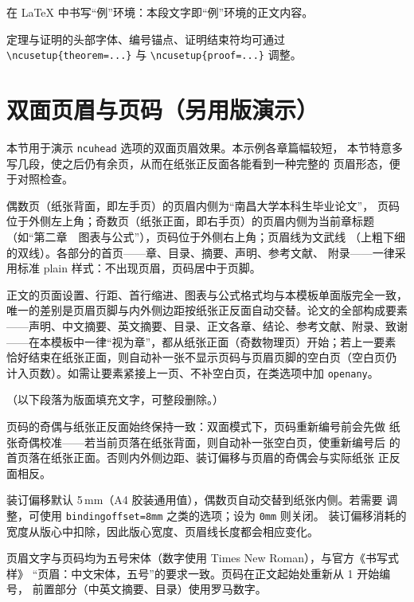 \documentclass[official]{ncubachelor}
\begin{document}
\begin{example}
在 \LaTeX{} 中书写“例”环境：本段文字即“例”环境的正文内容。
\end{example}

\begin{remark}
定理与证明的头部字体、编号锚点、证明结束符均可通过
\verb|\ncusetup{theorem=...}| 与 \verb|\ncusetup{proof=...}| 调整。
\end{remark}

\zhlipsum[3-7]

\section{双面页眉与页码（另用版演示）}

本节用于演示 \verb|ncuhead| 选项的双面页眉效果。本示例各章篇幅较短，
本节特意多写几段，使之后仍有余页，从而在纸张正反面各能看到一种完整的
页眉形态，便于对照检查。

偶数页（纸张背面，即左手页）的页眉内侧为“南昌大学本科生毕业论文”，
页码位于外侧左上角；奇数页（纸张正面，即右手页）的页眉内侧为当前章标题
（如“第二章　图表与公式”），页码位于外侧右上角；页眉线为文武线
（上粗下细的双线）。各部分的首页——章、目录、摘要、声明、参考文献、
附录——一律采用标准 plain 样式：不出现页眉，页码居中于页脚。

正文的页面设置、行距、首行缩进、图表与公式格式均与本模板单面版完全一致，
唯一的差别是页眉页脚与内外侧边距按纸张正反面自动交替。论文的全部构成要素
——声明、中文摘要、英文摘要、目录、正文各章、结论、参考文献、附录、致谢
——在本模板中一律“视为章”，都从纸张正面（奇数物理页）开始；若上一要素
恰好结束在纸张正面，则自动补一张不显示页码与页眉页脚的空白页（空白页仍
计入页数）。如需让要素紧接上一页、不补空白页，在类选项中加 \verb|openany|。

（以下段落为版面填充文字，可整段删除。）

页码的奇偶与纸张正反面始终保持一致：双面模式下，页码重新编号前会先做
纸张奇偶校准——若当前页落在纸张背面，则自动补一张空白页，使重新编号后
的首页落在纸张正面。否则内外侧边距、装订偏移与页眉的奇偶会与实际纸张
正反面相反。

装订偏移默认 5\,mm（A4 胶装通用值），偶数页自动交替到纸张内侧。若需要
调整，可使用 \verb|bindingoffset=8mm| 之类的选项；设为 \verb|0mm| 则关闭。
装订偏移消耗的宽度从版心中扣除，因此版心宽度、页眉线长度都会相应变化。

页眉文字与页码均为五号宋体（数字使用 Times New Roman），与官方《书写式样》
“页眉：中文宋体，五号”的要求一致。页码在正文起始处重新从 1 开始编号，
前置部分（中英文摘要、目录）使用罗马数字。
\end{document}
